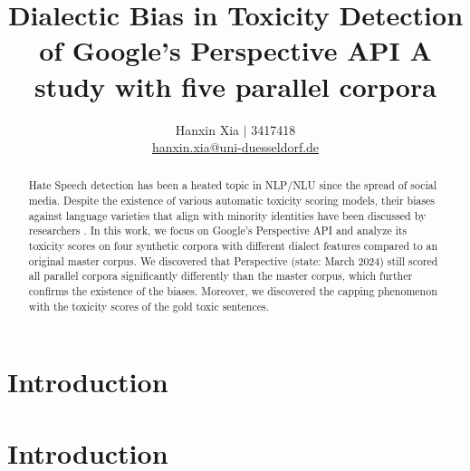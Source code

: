 \documentclass[11pt]{article}
\title{Dialectic Bias in Toxicity Detection of Google's Perspective API
\bigbreak A study with five parallel corpora}
\author{Hanxin Xia $\vert$ 3417418\\
  \href{mailto://hanxin.xia@uni-duesseldorf.de}{hanxin.xia@uni-duesseldorf.de}}
\begin{document}
\maketitle

\begin{abstract}
Hate Speech detection has been a heated topic in NLP/NLU since the spread of social media. Despite the existence of various automatic toxicity scoring models, their biases against language varieties that align with minority identities have been discussed by researchers \citep{sap-etal-2019-risk}. In this work, we focus on Google’s Perspective API and analyze its toxicity scores on four synthetic corpora with different dialect features compared to an original master corpus. We discovered that Perspective (state: March 2024) still scored all parallel corpora significantly differently than the master corpus, which further confirms the existence of the biases. Moreover, we discovered the capping phenomenon with the toxicity scores of the gold toxic sentences.
\end{abstract}


\section{Introduction}




















































\newpage

\section{Introduction}
\end{document}
